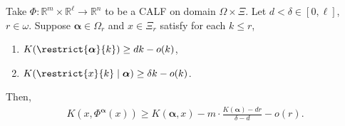 \begin{theorem} \label{theorem:finitary} 
    Take $\Phi : \mathbb{R}^m \times \mathbb{R}^\ell \to \mathbb{R}^n$ to be a CALF on domain $\Omega \times \Xi$. Let $d < \delta \in [0, \ell]$, $r \in \omega$. Suppose $\boldsymbol{\alpha} \in \Omega_r$ and $x \in \Xi_r$ satisfy for each $k \leq r$,
    \begin{enumerate}[label = (\roman*)]
        \item $K(\restrict{\boldsymbol{\alpha}}{k}) \geq d k - o(k)$,
        \item $K(\restrict{x}{k} \mid \boldsymbol{\alpha}) \geq \delta k - o(k)$.
    \end{enumerate}
    Then,
    \begin{align*}
        K(x, \Phi^{\boldsymbol{\alpha}}(x)) \geq K(\boldsymbol{\alpha}, x) - m \cdot \frac{K(\boldsymbol{\alpha}) - dr}{\delta - d} - o(r).
    \end{align*}
\end{theorem}

